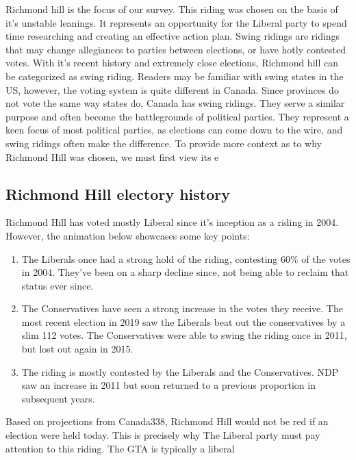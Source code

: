 \documentclass[
]{article}
\begin{document}
Richmond hill is the focus of our survey. This riding was chosen on the
basis of it's unstable leanings. It represents an opportunity for the
Liberal party to spend time researching and creating an effective action
plan. Swing ridings are ridings that may change allegiances to parties
between elections, or have hotly contested votes. With it's recent
history and extremely close elections, Richmond hill can be categorized
as swing riding. Readers may be familiar with swing states in the US,
however, the voting system is quite different in Canada. Since provinces
do not vote the same way states do, Canada has swing ridings. They serve
a similar purpose and often become the battlegrounds of political
parties. They represent a keen focus of most political parties, as
elections can come down to the wire, and swing ridings often make the
difference. To provide more context as to why Richmond Hill was chosen,
we must first view its e

\hypertarget{richmond-hill-electory-history}{%
\subsection{Richmond Hill electory
history}\label{richmond-hill-electory-history}}

Richmond Hill has voted mostly Liberal since it's inception as a riding
in 2004. However, the animation below showcases some key points:

\begin{enumerate}
\def\labelenumi{\arabic{enumi}.}
\item
  The Liberals once had a strong hold of the riding, contesting 60\% of
  the votes in 2004. They've been on a sharp decline since, not being
  able to reclaim that status ever since.
\item
  The Conservatives have seen a strong increase in the votes they
  receive. The most recent election in 2019 saw the Liberals beat out
  the conservatives by a slim 112 votes. The Conservatives were able to
  swing the riding once in 2011, but lost out again in 2015.
\item
  The riding is mostly contested by the Liberals and the Conservatives.
  NDP saw an increase in 2011 but soon returned to a previous proportion
  in subsequent years.
\end{enumerate}

Based on projections from Canada338, Richmond Hill would not be red if
an election were held today. This is precisely why The Liberal party
must pay attention to this riding. The GTA is typically a liberal
\end{document}
